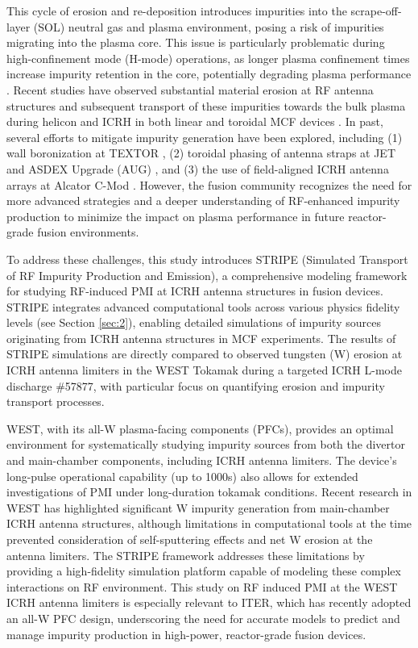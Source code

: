 \documentclass[10pt]{iopart}
\begin{document}
This cycle of erosion and re-deposition introduces impurities into the scrape-off-layer (SOL) neutral gas and plasma environment, posing a risk of impurities migrating into the plasma core. This issue is particularly problematic during high-confinement mode (H-mode) operations, as longer plasma confinement times increase impurity retention in the core, potentially degrading plasma performance \cite{Angioni:2021, Angioni:2014 }. Recent studies have observed substantial material erosion at RF antenna structures and subsequent transport of these impurities towards the bulk plasma during helicon and ICRH in both linear \cite{Beers1, Beers2} and toroidal MCF devices \cite{Klepper2022}. In past, several efforts to mitigate impurity generation have been explored, including (1) wall boronization at TEXTOR \cite{waelbroeck1989influence}, (2) toroidal phasing of antenna straps at JET \cite{bures1988modification} and ASDEX Upgrade (AUG) \cite{bobkov2016making, bobkov2019impact}, and (3) the use of field-aligned ICRH antenna arrays at Alcator C-Mod \cite{wukitch2013characterization}. However, the fusion community recognizes the need for more advanced strategies and a deeper understanding of RF-enhanced impurity production to minimize the impact on plasma performance in future reactor-grade fusion environments.

To address these challenges, this study introduces STRIPE (Simulated Transport of RF Impurity Production and Emission), a comprehensive modeling framework for studying RF-induced PMI at ICRH antenna structures in fusion devices. STRIPE integrates advanced computational tools across various physics fidelity levels (see Section \ref{sec:2}), enabling detailed simulations of impurity sources originating from ICRH antenna structures in MCF experiments. The results of STRIPE simulations are directly compared to observed tungsten (W) erosion at ICRH antenna limiters in the WEST Tokamak during a targeted ICRH L-mode discharge \#57877, with particular focus on quantifying erosion and impurity transport processes.

WEST, with its all-W plasma-facing components (PFCs), provides an optimal environment for systematically studying impurity sources from both the divertor and main-chamber components, including ICRH antenna limiters. The device’s long-pulse operational capability (up to 1000s) also allows for extended investigations of PMI under long-duration tokamak conditions. Recent research in WEST \cite{Klepper2022} has highlighted significant W impurity generation from main-chamber ICRH antenna structures, although limitations in computational tools at the time prevented consideration of self-sputtering effects and net W erosion at the antenna limiters. The STRIPE framework addresses these limitations by providing a high-fidelity simulation platform capable of modeling these complex interactions on RF environment. This study on RF induced PMI at the WEST ICRH antenna limiters is especially relevant to ITER, which has recently adopted an all-W PFC design, underscoring the need for accurate models to predict and manage impurity production in high-power, reactor-grade fusion devices.
\end{document}
